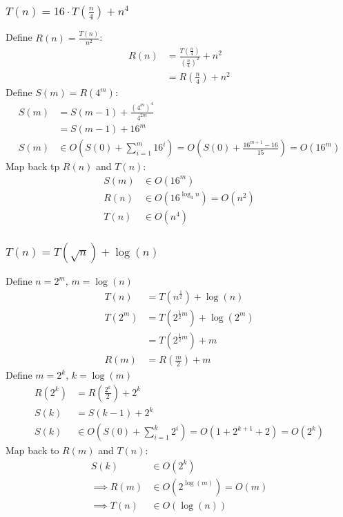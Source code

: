 \documentclass[9pt]{extarticle}
\begin{document}
\subsubsection{$T(n) = 16\cdot T(\frac{n}{4}) + n^4$}
Define $R(n) = \frac{T(n)}{n^2}$:
\begin{align*}
    R(n) &= \frac{T(\frac{n}{4})}{(\frac{n}{4})^2} + n^2\\
    &= R(\frac{n}{4}) + n^2
\end{align*}
Define $S(m) = R(4^m)$:
\begin{align*}
    S(m) &= S(m - 1) + \frac{(4^m)^4}{4^{2m}}\\
    &= S(m - 1) + 16^m\\
    S(m) &\in O(S(0) + \sum_{i=1}^{m}16^i) = O(S(0) + \frac{16^{m+1}-16}{15}) = O(16^m)
\end{align*}
Map back tp $R(n)$ and $T(n)$:
\begin{align*}
    S(m) &\in O(16^m)\\
    R(n) &\in O(16^{\log_4n}) = O(n^2)\\
    T(n) &\in O(n^4)
\end{align*}


\subsubsection{$T(n) = T(\sqrt{n}) + \log(n)$}
Define $n = 2^m$, $m = \log(n)$ 
\begin{align*}
    T(n) &= T(n^{\frac{1}{2}}) + \log(n)\\
    T(2^m) &= T(2^{\frac{1}{2} m}) + \log(2^m)\\
    &= T(2^{\frac{1}{2} m}) + m\\
    R(m) &= R(\frac{m}{2}) + m
\end{align*}
Define $m = 2^k$, $k = \log(m)$
\begin{align*}
    R(2^k) &= R(\frac{2^k}{2}) + 2^k\\
    S(k) &= S(k-1) + 2^k\\
    S(k) &\in O(S(0) + \sum_{i=1}^{k} 2^i) = O(1 + 2^{k + 1} + 2) = O(2^k)
\end{align*}
Map back to $R(m)$ and $T(n)$:
\begin{align*}
    S(k) &\in O(2^k)\\
    \implies R(m) &\in O(2^{\log(m)}) = O(m)\\
    \implies T(n) &\in O(\log(n))
\end{align*}
\end{document}
